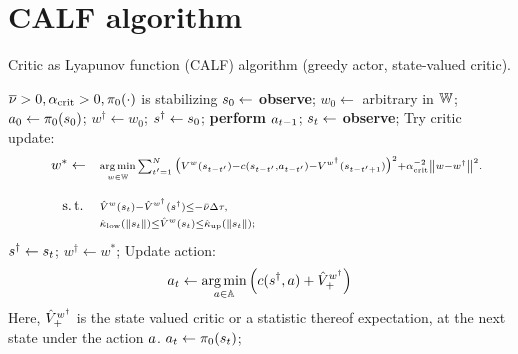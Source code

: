\documentclass[12pt,twoside]{../../mitthesis}
\begin{document}
\section*{CALF algorithm}
\begin{algorithm}
    \caption{Critic as Lyapunov function (CALF) algorithm (greedy actor, state-valued critic).}
    \begin{algorithmic}[1]
         $\overline{\nu}  > 0, \alpha_{{\text{crit}}} > 0, \pi_0(\cdot)$ is stabilizing
        \STATE $s_0 \gets$ \textbf{observe};
        \STATE $w_{0} \gets $ arbitrary in ${\mathbb{W}}$;
        \STATE $a_0 \gets  \pi_0(s_0)$;
        \STATE $w^\dagger \gets w_{0}$;
        \STATE $s^\dagger \gets s_0$;
        \STATE    \textbf{perform} $a_{t -1}$;
        \STATE $s_t \gets$ \textbf{observe};
        \STATE Try critic update: 
        \[
            \begin{array}{lrl}
                & w^* \gets & {\scriptstyle \operatorname*{\text{arg\,min}} \limits_{w \in \mathbb W} \sum_{t' = 1}^N \big(V^w(s_{t - t'}) - c(s_{t - t'}, a_{t - t'}) - V^{w^\dagger}(s_{t - t' + 1})\big)^2 + \alpha_{{\text{crit}}}^{-2}\left\lVert w - w^\dagger\right\rVert^2.} \\                                                                \\
                          & \text{s.\,t.\,}                              & {\scriptstyle \hat {V}^w(s_t) - \hat {V}^{w^\dagger}(s^\dagger) \leq -{\bar \nu} \Delta \tau,}     \\
                          &                                   & {\scriptstyle \hat \kappa_{\text{low}}(\left\lVert s_t\right\rVert) \leq \hat {V}^{w}(s_t) \leq \hat \kappa_{\text{up}}(\left\lVert s_t\right\rVert); }
            \end{array}
        \]
        \STATE $s^\dagger \gets s_t$;
        \STATE $w^\dagger \gets w^*$;
        \STATE    Update action:
        \[
            a_t \leftarrow \operatorname*{\text{arg\,min}}\limits_{a \in \mathbb A}  \left(c(s^\dagger, a) + \hat {V}^{w^\dagger}_+\right)
        \]
        Here, $\hat {V}^{w^\dagger}_+$ is \eg the state valued critic or a statistic thereof \eg expectation, at the next state under the action $a$.
        \ELSE
        \STATE $a_t \leftarrow \pi_0(s_t)$;
        \ENDIF
        \ENDFOR
    \end{algorithmic}
    \label{alg_calfstate}
\end{algorithm}
\end{document}

